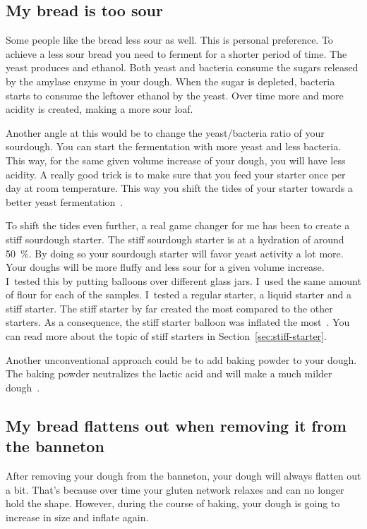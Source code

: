 \subsection{My bread is too sour}

Some people like the bread less sour as well. This
is personal preference. To achieve a less sour bread
you need to ferment for a shorter period of time.
The yeast produces  and ethanol. Both yeast and
bacteria consume the sugars released by the amylase enzyme
in your dough. When the sugar is depleted, bacteria starts to
consume the leftover ethanol by the yeast. Over time more
and more acidity is created, making a more sour loaf.

Another angle at this would be to change the yeast/bacteria
ratio of your sourdough. You can start the fermentation with
more yeast and less bacteria. This way, for the same given
volume increase of your dough, you will have less acidity.
A really good trick is to make sure that you feed your starter
once per day at room temperature. This way you shift
the tides of your starter towards a better yeast fermentation~\cite*{more+active+starter}.

To shift the tides even further, a real game changer
for me has been to create a stiff sourdough starter. The
stiff sourdough starter is at a hydration of around \qty{50}{\percent}.
By doing so your sourdough starter will favor yeast
activity a lot more. Your doughs will be more fluffy and less
sour for a given volume increase. I~tested this
by putting balloons over different glass jars. I~used
the same amount of flour for each of the samples.
I~tested a regular starter, a liquid starter and a stiff
starter. The stiff starter by far created the most 
compared to the other starters. As a consequence, the stiff
starter balloon was inflated the most~\cite{stiff+starter}. You can read more
about the topic of stiff starters in Section~\ref{sec:stiff-starter}.

Another unconventional approach could be to add baking
powder to your dough. The baking powder neutralizes the
lactic acid and will make a much milder
dough~\cite{baking+powder+reduce-acidity}.

\subsection{My bread flattens out when removing it from the banneton}

After removing your dough from the banneton, your dough will always
flatten out a bit. That's because over time your gluten network
relaxes and can no longer hold the shape. However, during the course
of baking, your dough is going to increase in size and inflate again.

